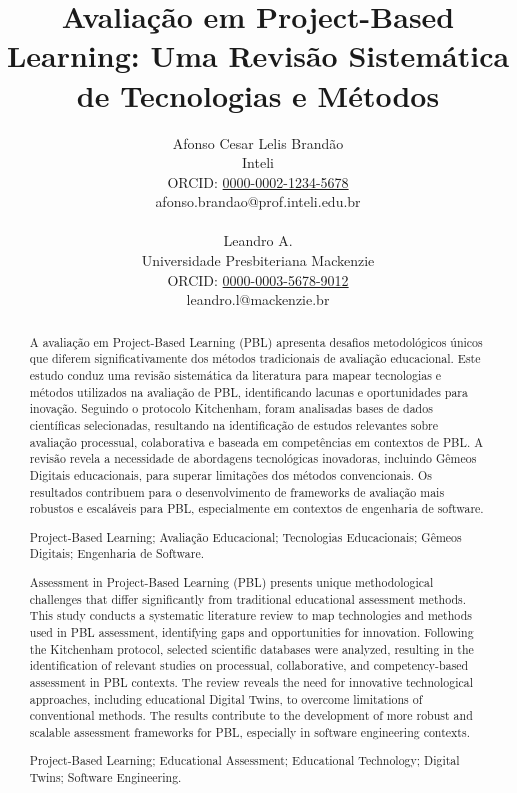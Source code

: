 \documentclass[english, spanish, brazilian]{RBIEarticle} %
\title{Avaliação em Project-Based Learning: Uma Revisão Sistemática de Tecnologias e Métodos}
\author{%
\parbox{8cm}{%
Afonso Cesar Lelis Brandão\\
Inteli\\
ORCID: \href{https://orcid.org/0000-0002-1234-5678}{0000-0002-1234-5678}\\
afonso.brandao@prof.inteli.edu.br\\\\
Leandro A.\\
Universidade Presbiteriana Mackenzie\\
ORCID: \href{https://orcid.org/0000-0003-5678-9012}{0000-0003-5678-9012}\\
leandro.l@mackenzie.br}}
\begin{document}
\maketitle

\begin{otherlanguage}{brazilian}
\begin{abstract}
A avaliação em Project-Based Learning (PBL) apresenta desafios metodológicos únicos que diferem significativamente dos métodos tradicionais de avaliação educacional. Este estudo conduz uma revisão sistemática da literatura para mapear tecnologias e métodos utilizados na avaliação de PBL, identificando lacunas e oportunidades para inovação. Seguindo o protocolo Kitchenham, foram analisadas bases de dados científicas selecionadas, resultando na identificação de estudos relevantes sobre avaliação processual, colaborativa e baseada em competências em contextos de PBL. A revisão revela a necessidade de abordagens tecnológicas inovadoras, incluindo Gêmeos Digitais educacionais, para superar limitações dos métodos convencionais. Os resultados contribuem para o desenvolvimento de frameworks de avaliação mais robustos e escaláveis para PBL, especialmente em contextos de engenharia de software.

\keywords Project-Based Learning; Avaliação Educacional; Tecnologias Educacionais; Gêmeos Digitais; Engenharia de Software.
\end{abstract}
\end{otherlanguage}

\begin{otherlanguage}{english}
\begin{abstract}
Assessment in Project-Based Learning (PBL) presents unique methodological challenges that differ significantly from traditional educational assessment methods. This study conducts a systematic literature review to map technologies and methods used in PBL assessment, identifying gaps and opportunities for innovation. Following the Kitchenham protocol, selected scientific databases were analyzed, resulting in the identification of relevant studies on processual, collaborative, and competency-based assessment in PBL contexts. The review reveals the need for innovative technological approaches, including educational Digital Twins, to overcome limitations of conventional methods. The results contribute to the development of more robust and scalable assessment frameworks for PBL, especially in software engineering contexts.

\keywords Project-Based Learning; Educational Assessment; Educational Technology; Digital Twins; Software Engineering.
\end{abstract}
\end{otherlanguage}
\end{document}
